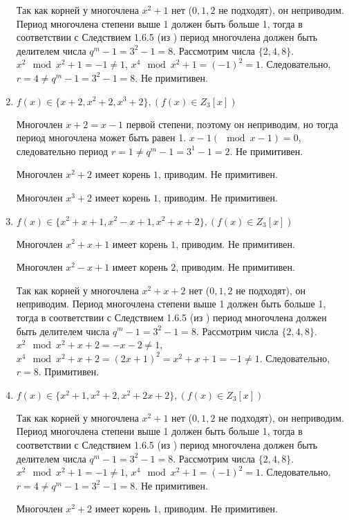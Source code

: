 \documentclass[utf8x, 14pt]{G7-32} %
\begin{document}
\begin{enumerate}
    Так как корней у многочлена $x^2+1$ нет ($0,1,2$ не подходят), он неприводим. Период многочлена степени выше 1 должен быть больше 1, тогда в соответствии с Следствием 1.6.5 (из \cite{hse:Teoria_Gener}) период многочлена должен быть делителем числа $q^m -1 = 3^2 -1 = 8$. Рассмотрим числа $\{2, 4, 8\}$. $x^2 \mod x^2 + 1 = -1 \neq 1$,  $x^4 \mod x^2 + 1 = (-1)^2 = 1$. Следовательно, $r=4 \neq q^m -1 = 3^2 -1 = 8$. Не примитивен.

    \item $f(x)\in\{x+2, x^2+2, x^3+2\}, (f(x)\in Z_3[x])$
    
     Многочлен $x+2 = x-1$ первой степени, поэтому он неприводим, но тогда период многочлена может быть равен 1. $x - 1 (\mod{x - 1}) = 0$, следовательно период $r = 1 \neq q^m - 1 = 3^1 -1 = 2$. Не примитивен.
     
     Многочлен $ x^2+2$ имеет корень $1$, приводим. Не примитивен.
     
     Многочлен $ x^3+2$ имеет корень $1$, приводим. Не примитивен.

    \item $f(x)\in\{x^2+x+1, x^2-x+1, x^2+x+2\}, (f(x)\in Z_3[x])$
    
    Многочлен $ x^2+x+1$ имеет корень $1$, приводим. Не примитивен.
    
    Многочлен $ x^2-x+1$ имеет корень $2$, приводим. Не примитивен.
    
    Так как корней у многочлена $x^2+x+2$ нет ($0,1,2$ не подходят), он неприводим. Период многочлена степени выше 1 должен быть больше 1, тогда в соответствии с Следствием 1.6.5 (из \cite{hse:Teoria_Gener}) период многочлена должен быть делителем числа $q^m -1 = 3^2 -1 = 8$. Рассмотрим числа $\{2, 4, 8\}$. $x^2 \mod x^2 + x +2 = - x - 2 \neq 1$,  $x^4 \mod x^2 + x +2 = (2x + 1)^2 = x^2 + x + 1 = - 1 \neq 1$. Следовательно, $r=8$. Примитивен.

    \item $f(x)\in\{x^2+1, x^2+2, x^2+2x+2\}, (f(x)\in Z_3[x])$
    
    Так как корней у многочлена $x^2+1$ нет ($0,1,2$ не подходят), он неприводим. Период многочлена степени выше 1 должен быть больше 1, тогда в соответствии с Следствием 1.6.5 (из \cite{hse:Teoria_Gener}) период многочлена должен быть делителем числа $q^m -1 = 3^2 -1 = 8$. Рассмотрим числа $\{2, 4, 8\}$. $x^2 \mod x^2 + 1 = -1 \neq 1$,  $x^4 \mod x^2 + 1 = (-1)^2 = 1$. Следовательно, $r=4\neq q^m -1 = 3^2 -1 = 8$. Не примитивен.
    
    Многочлен $ x^2+2$ имеет корень $1$, приводим. Не примитивен.
    

\end{enumerate}
\end{document}
